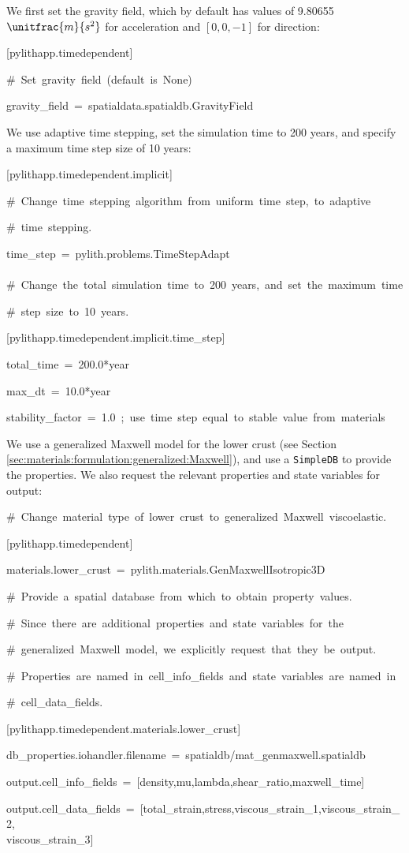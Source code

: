We first set the gravity field, which by default has values of 9.80655
$\unitfrac{m}{s^{2}}$ for acceleration and $\left[0,0,-1\right]$
for direction:
\begin{lyxcode}
{[}pylithapp.timedependent{]}

\#~Set~gravity~field~(default~is~None)

gravity\_field~=~spatialdata.spatialdb.GravityField
\end{lyxcode}
We use adaptive time stepping, set the simulation time to 200 years,
and specify a maximum time step size of 10 years:
\begin{lyxcode}
{[}pylithapp.timedependent.implicit{]}

\#~Change~time~stepping~algorithm~from~uniform~time~step,~to~adaptive

\#~time~stepping.

time\_step~=~pylith.problems.TimeStepAdapt~\\
~\\


\#~Change~the~total~simulation~time~to~200~years,~and~set~the~maximum~time

\#~step~size~to~10~years.

{[}pylithapp.timedependent.implicit.time\_step{]}

total\_time~=~200.0{*}year

max\_dt~=~10.0{*}year

stability\_factor~=~1.0~;~use~time~step~equal~to~stable~value~from~materials
\end{lyxcode}
We use a generalized Maxwell model for the lower crust (see Section
\vref{sec:materials:formulation:generalized:Maxwell}), and use a \texttt{SimpleDB} to
provide the properties. We also request the relevant properties and
state variables for output:
\begin{lyxcode}
\#~Change~material~type~of~lower~crust~to~generalized~Maxwell~viscoelastic.

{[}pylithapp.timedependent{]}

materials.lower\_crust~=~pylith.materials.GenMaxwellIsotropic3D

\#~Provide~a~spatial~database~from~which~to~obtain~property~values.

\#~Since~there~are~additional~properties~and~state~variables~for~the

\#~generalized~Maxwell~model,~we~explicitly~request~that~they~be~output.

\#~Properties~are~named~in~cell\_info\_fields~and~state~variables~are~named~in

\#~cell\_data\_fields.

{[}pylithapp.timedependent.materials.lower\_crust{]}

db\_properties.iohandler.filename~=~spatialdb/mat\_genmaxwell.spatialdb

output.cell\_info\_fields~=~{[}density,mu,lambda,shear\_ratio,maxwell\_time{]}

output.cell\_data\_fields~=~{[}total\_strain,stress,viscous\_strain\_1,viscous\_strain\_2,~\\
viscous\_strain\_3{]}
\end{lyxcode}
